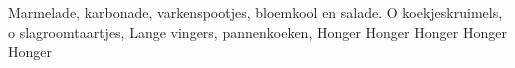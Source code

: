 \beginverse*
Marmelade, karbonade, varkenspootjes, bloemkool en salade.
O koekjeskruimels, o slagroomtaartjes,
Lange vingers, pannenkoeken,
\endverse
\beginchorus
Honger
Honger
Honger
Honger
Honger
\endchorus
\endsong